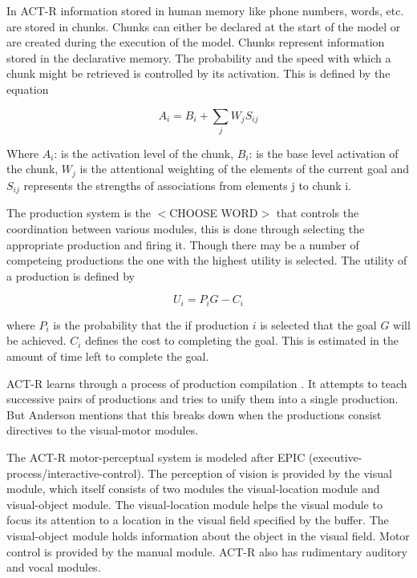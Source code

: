 In ACT-R information stored in human memory like phone numbers, words,
etc. are stored in chunks. Chunks can either be declared at the start
of the model or are created during the execution of the model. Chunks
represent information stored in the declarative memory. The
probability and the speed with which a chunk might be retrieved is
controlled by its activation. This is defined by the equation

\begin{equation}
  A_i = B_i + \sum_j W_j S_{ij}
\end{equation}

Where $A_i$: is the activation level of the chunk, $B_i$: is the base
level activation of the chunk, $W_j$ is the attentional weighting of
the elements of the current goal and $S_{ij}$ represents the strengths
of associations from elements j to chunk i.

The production system is the $<$CHOOSE WORD$>$ that controls the
coordination between various modules, this is done through selecting
the appropriate production and firing it. Though there may be a number
of competeing productions the one with the highest utility is
selected.  The utility of a production is defined by 

\begin{equation}
  U_i = P_iG - C_i
\end{equation}

where $P_i$ is the probability that the if production $i$ is selected
that the goal $G$ will be achieved. $C_i$ defines the cost to
completing the goal. This is estimated in the amount of time left to
complete the goal. 

ACT-R learns through a process of production compilation
\cite{oai:CiteSeerPSU:518586}. It attempts to teach successive pairs
of productions and tries to unify them into a single production. But
Anderson mentions that this breaks down when the productions consist
directives to the visual-motor modules.



The ACT-R motor-perceptual system is modeled after EPIC
(executive-process/interactive-control). The perception of vision is
provided by the visual module, which itself consists of two modules
the visual-location module and visual-object module. The
visual-location module helps the visual module to focus its attention
to a location in the visual field specified by the buffer. The
visual-object module holds information about the object in the visual
field. Motor control is provided by the manual module. ACT-R also has
rudimentary auditory and vocal modules\cite{anderson_jr-etal:2004a}.



